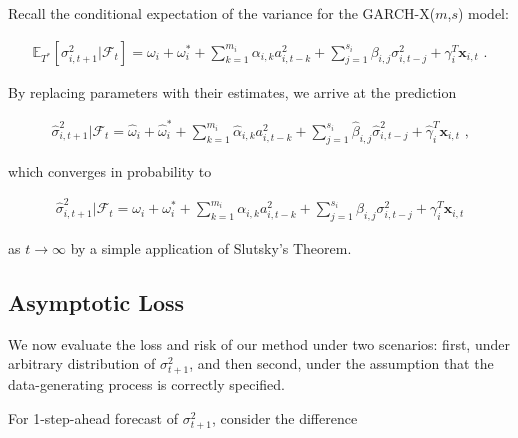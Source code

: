 \documentclass[11pt,3p,review,authoryear]{elsarticle}
\newcommand{\x}{\textbf{x}}
\def\E{\mathbb{E}} %
\theoremstyle{definition}
\newenvironment{proof-of-proposition}[1][{}]{\noindent{\bf
    Proof of Proposition {#1}}
  \hspace*{.5em}}{\qed\bigskip\\}
\begin{document}
\begin{proof-of-proposition}
Recall the conditional expectation of the variance for the GARCH-X($m$,$s$) model:

\begin{align*}
\E_{T^{*}}[\sigma^{2}_{i,t+1}|\mathcal{F}_{t}] = \omega_{i} + \omega^{*}_i + \sum^{m_{i}}_{k=1}\alpha_{i,k}a^{2}_{i,t-k} + \sum_{j=1}^{s_{i}}\beta_{i,j}\sigma_{i,t-j}^{2} + \gamma_{i}^{T} \x_{i,t} \text{ .}
\end{align*}

By replacing parameters with their estimates, we arrive at the prediction 

\begin{align*}
\hat\sigma^{2}_{i,t+1}|\mathcal{F}_{t} = \hat\omega_{i} + \hat\omega^{*}_i + \sum^{m_{i}}_{k=1}\hat\alpha_{i,k}a^{2}_{i,t-k} + \sum_{j=1}^{s_{i}}\hat\beta_{i,j}\hat\sigma_{i,t-j}^{2} + \hat\gamma_{i}^{T} \x_{i,t} \text { ,}
\end{align*}

which converges in probability to 

\begin{align*}
  \hat\sigma^{2}_{i,t+1}|\mathcal{F}_{t} = \omega_{i} + \omega^{*}_i + \sum^{m_{i}}_{k=1}\alpha_{i,k}a^{2}_{i,t-k} + \sum_{j=1}^{s_{i}}\beta_{i,j}\sigma_{i,t-j}^{2} + \gamma_{i}^{T} \x_{i,t}
  \end{align*}

as $t\rightarrow\infty$ by a simple application of Slutsky's Theorem.

\end{proof-of-proposition}

\subsection{Asymptotic Loss}

We now evaluate the loss and risk of our method under two scenarios: first, under arbitrary distribution of $\sigma^{2}_{t+1}$, and then second, under the assumption that the data-generating process is correctly specified.

For 1-step-ahead forecast of $\sigma^{2}_{t+1}$, consider the difference 
\end{document}
